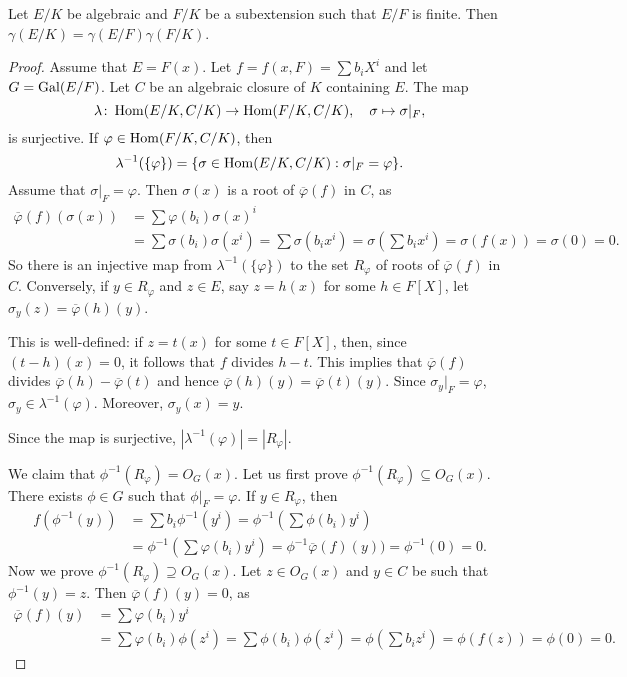 \begin{proposition}
    Let $E/K$ be algebraic and $F/K$ be a subextension such that 
    $E/F$ is finite. Then $\gamma(E/K)=\gamma(E/F)\gamma(F/K)$. 
\end{proposition}

 \begin{proof}
    Assume that $E=F(x)$. Let $f=f(x,F)=\sum b_iX^i$ and
    let $G=\operatorname{Gal}(E/F)$. Let $C$ be an algebraic closure of $K$ containing $E$. 
    The map
    \[
    \lambda\colon \operatorname{Hom}(E/K,C/K)\to\operatorname{Hom}(F/K,C/K),\quad
    \sigma\mapsto\sigma|_F,
    \]
    is surjective. If $\varphi\in\operatorname{Hom}(F/K,C/K)$, then
    \[
    \lambda^{-1}(\{\varphi\})=\{\sigma\in\operatorname{Hom}(E/K,C/K):\sigma|_F=\varphi\}.
    \]
    Assume that $\sigma|_F=\varphi$. Then 
    $\sigma(x)$ is a root of $\overline{\varphi}(f)$ in $C$, as 
    \begin{align*}
    \overline{\varphi}(f)(\sigma(x))&=\sum \varphi(b_i)\sigma(x)^i\\
    &=\sum\sigma(b_i)\sigma(x^i)
    =\sum\sigma(b_ix^i)=\sigma\left(\sum b_ix^i\right)=\sigma(f(x))=\sigma(0)=0.
    \end{align*}
    So there is an injective map from $\lambda^{-1}(\{\varphi\})$ 
    to the set $R_{\varphi}$ of roots of $\overline{\varphi}(f)$ in $C$. Conversely,
    if $y\in R_{\varphi}$ and $z\in E$, say $z=h(x)$ for some $h\in F[X]$, 
    let $\sigma_y(z)=\overline{\varphi}(h)(y)$. 
    
    This is well-defined: if $z=t(x)$ 
    for some $t\in F[X]$, then, since $(t-h)(x)=0$, it follows that 
    $f$ divides $h-t$. This implies that $\overline{\varphi}(f)$ divides
    $\overline{\varphi}(h)-\overline{\varphi}(t)$ and hence 
    $\overline{\varphi}(h)(y)=\overline{\varphi}(t)(y)$. 
    Since $\sigma_y|_F=\varphi$, $\sigma_y\in\lambda^{-1}(\varphi)$. 
    Moreover, $\sigma_y(x)=y$. 
    
    Since the map is surjective, $|\lambda^{-1}(\varphi)|=|R_{\varphi}|$. 
    
    We claim that $\phi^{-1}(R_{\varphi})=O_G(x)$. Let us first prove $\phi^{-1}(R_{\varphi})\subseteq O_G(x)$.  
    There exists $\phi\in G$ such that $\phi|_F=\varphi$. If $y\in R_{\varphi}$, 
    then 
    \begin{align*}
    f(\phi^{-1}(y))&=\sum b_i\phi^{-1}(y^i)=\phi^{-1}\left(\sum\phi(b_i)y^i\right)\\
    &=\phi^{-1}\left(\sum\varphi(b_i)y^i\right)=\phi^{-1}\overline{\varphi}(f)(y))=\phi^{-1}(0)=0.
    \end{align*}
    Now we prove $\phi^{-1}(R_{\varphi})\supseteq O_G(x)$. Let $z\in O_G(x)$ and $y\in C$ be such that 
    $\phi^{-1}(y)=z$. Then $\overline{\varphi}(f)(y)=0$, as
    \begin{align*}
    \overline{\varphi}(f)(y)&=\sum\varphi(b_i)y^i\\
    &=\sum\varphi(b_i)\phi(z^i)
    =\sum\phi(b_i)\phi(z^i)=\phi\left(\sum b_iz^i\right)=\phi(f(z))=\phi(0)=0.
    \end{align*}
    

\end{proof}

